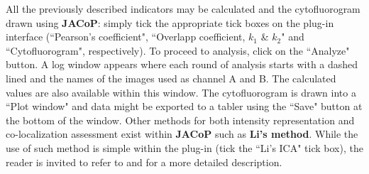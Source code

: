 \documentclass[]{spie}  %
\begin{document}
All the previously described indicators may be calculated and the cytofluorogram drawn using \textbf{JACoP}: simply tick the appropriate tick boxes on the plug-in interface (``Pearson's coefficient", ``Overlapp coefficient, $k_1$ \& $k_2$" and ``Cytofluorogram", respectively). To proceed to analysis, click on the ``Analyze" button. A log window appears where each round of analysis starts with a dashed lined and the names of the images used as channel A and B. The calculated values are also available within this window. The cytofluorogram is drawn into a ``Plot window" and data might be exported to a tabler using the ``Save" button at the bottom of the window. Other methods for both intensity representation and co-localization assessment exist within \textbf{JACoP} such as \textbf{Li's method}. While the use of such method is simple within the plug-in (tick the ``Li's ICA" tick box), the reader is invited to refer to\cite{Li2004} and \cite{tutrev2006} for a more detailed description.
\end{document}
